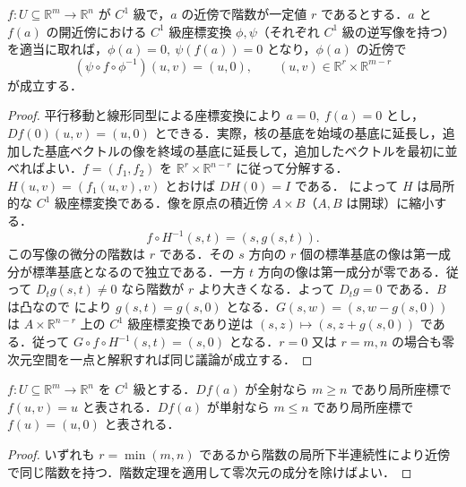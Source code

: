 \begin{prop}[階数定理]
$f:U\subseteq\mathbb R^m\to\mathbb R^n$ が $C^1$ 級で，$a$ の近傍で階数が一定値 $r$ であるとする．$a$ と $f(a)$ の開近傍における $C^1$ 級座標変換 $\phi,\psi$（それぞれ $C^1$ 級の逆写像を持つ）を適当に取れば，$\phi(a)=0,\ \psi(f(a))=0$ となり，$\phi(a)$ の近傍で
\[
(\psi\circ f\circ\phi^{-1})(u,v)=(u,0),\qquad (u,v)\in\mathbb R^r\times\mathbb R^{m-r}
\]
が成立する．
\end{prop}
\begin{proof}
平行移動と線形同型による座標変換により $a=0,\ f(a)=0$ とし，$Df(0)(u,v)=(u,0)$ とできる．実際，核の基底を始域の基底に延長し，追加した基底ベクトルの像を終域の基底に延長して，追加したベクトルを最初に並べればよい．$f=(f_1,f_2)$ を $\mathbb R^r\times\mathbb R^{n-r}$ に従って分解する．$H(u,v)=(f_1(u,v),v)$ とおけば $DH(0)=I$ である． によって $H$ は局所的な $C^1$ 級座標変換である．像を原点の積近傍 $A\times B$（$A,B$ は開球）に縮小する．
\[
f\circ H^{-1}(s,t)=(s,g(s,t)).
\]
この写像の微分の階数は $r$ である．その $s$ 方向の $r$ 個の標準基底の像は第一成分が標準基底となるので独立である．一方 $t$ 方向の像は第一成分が零である．従って $D_tg(s,t)\ne0$ なら階数が $r$ より大きくなる．よって $D_tg=0$ である．$B$ は凸なので  により $g(s,t)=g(s,0)$ となる．$G(s,w)=(s,w-g(s,0))$ は $A\times\mathbb R^{n-r}$ 上の $C^1$ 級座標変換であり逆は $(s,z)\mapsto(s,z+g(s,0))$ である．従って $G\circ f\circ H^{-1}(s,t)=(s,0)$ となる．$r=0$ 又は $r=m,n$ の場合も零次元空間を一点と解釈すれば同じ議論が成立する．
\end{proof}
\begin{prop}
$f:U\subseteq\mathbb R^m\to\mathbb R^n$ を $C^1$ 級とする．$Df(a)$ が全射なら $m\geq n$ であり局所座標で $f(u,v)=u$ と表される．$Df(a)$ が単射なら $m\leq n$ であり局所座標で $f(u)=(u,0)$ と表される．
\end{prop}
\begin{proof}
いずれも $r=\min(m,n)$ であるから階数の局所下半連続性により近傍で同じ階数を持つ．階数定理を適用して零次元の成分を除けばよい．
\end{proof}
